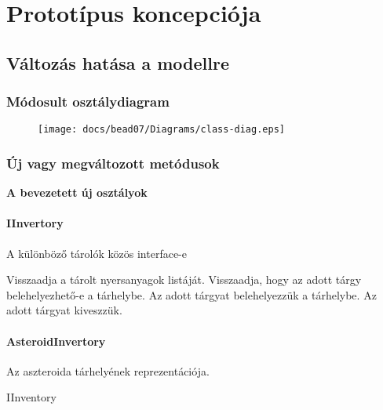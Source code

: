 \documentclass[../../projlab]{subfiles}
\begin{document}
\makeatletter


\makeatother


\chapter{Prototípus koncepciója}
\setcounter{section}{-1}

\section{Változás hatása a modellre}

\subsection{Módosult osztálydiagram}
\begin{figure}[H] 
    \centering 
    \texttt{[image: docs/bead07/Diagrams/class-diag.eps]} 
    \caption{} 
\end{figure} 

\subsection{Új vagy megváltozott metódusok}

\textbf{A bevezetett új osztályok}

\subsubsection{IInvertory}
\begin{class-template-responsibility}
    A különböző tárolók közös interface-e
\end{class-template-responsibility}
\begin{class-template-method}
                {Visszaadja a tárolt nyersanyagok listáját.}
                {Visszaadja, hogy az adott tárgy belehelyezhető-e a tárhelybe.}
                {Az adott tárgyat belehelyezzük a tárhelybe.}
                {Az adott tárgyat kiveszzük.}                
\end{class-template-method}

\subsubsection{AsteroidInvertory}
\begin{class-template-responsibility}
    Az aszteroida tárhelyének reprezentációja.
\end{class-template-responsibility}
\begin{class-template-interface}
    IInventory
\end{class-template-interface}
\begin{class-template-attribute}
\end{class-template-attribute}
\end{document}
